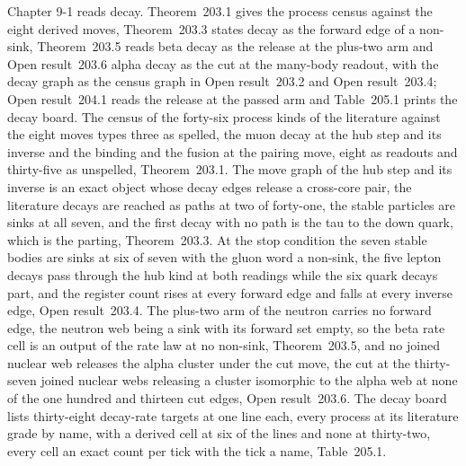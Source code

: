 Chapter 9-1 reads decay. Theorem~203.1 gives the process census against the eight derived moves, Theorem~203.3 states decay as the forward edge of a non-sink, Theorem~203.5 reads beta decay as the release at the plus-two arm and Open result~203.6 alpha decay as the cut at the many-body readout, with the decay graph as the census graph in Open result~203.2 and Open result~203.4; Open result~204.1 reads the release at the passed arm and Table~205.1 prints the decay board. The census of the forty-six process kinds of the literature against the eight moves types three as spelled, the muon decay at the hub step and its inverse and the binding and the fusion at the pairing move, eight as readouts and thirty-five as unspelled, Theorem~203.1. The move graph of the hub step and its inverse is an exact object whose decay edges release a cross-core pair, the literature decays are reached as paths at two of forty-one, the stable particles are sinks at all seven, and the first decay with no path is the tau to the down quark, which is the parting, Theorem~203.3. At the stop condition the seven stable bodies are sinks at six of seven with the gluon word a non-sink, the five lepton decays pass through the hub kind at both readings while the six quark decays part, and the register count rises at every forward edge and falls at every inverse edge, Open result~203.4. The plus-two arm of the neutron carries no forward edge, the neutron web being a sink with its forward set empty, so the beta rate cell is an output of the rate law at no non-sink, Theorem~203.5, and no joined nuclear web releases the alpha cluster under the cut move, the cut at the thirty-seven joined nuclear webs releasing a cluster isomorphic to the alpha web at none of the one hundred and thirteen cut edges, Open result~203.6. The decay board lists thirty-eight decay-rate targets at one line each, every process at its literature grade by name, with a derived cell at six of the lines and none at thirty-two, every cell an exact count per tick with the tick a name, Table~205.1.

